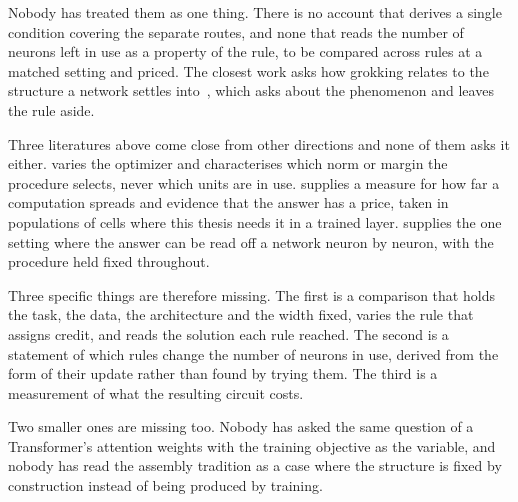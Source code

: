 Nobody has treated them as one thing. There is no account that derives a
single condition covering the separate routes, and none that reads the number
of neurons left in use as a property of the rule, to be compared across rules
at a matched setting and priced. The closest work asks how grokking relates to
the structure a network settles into~\cite{manningcoe_grokking_2025}, which
asks about the phenomenon and leaves the rule aside.

Three literatures above come close from other directions and none of them asks
it either.  varies the optimizer and characterises
which norm or margin the procedure selects, never which units are in use.
 supplies a measure for how far a computation spreads and
evidence that the answer has a price, taken in populations of cells where this
thesis needs it in a trained layer.  supplies the one setting where the
answer can be read off a network neuron by neuron, with the procedure held
fixed throughout.

Three specific things are therefore missing. The first is a comparison that
holds the task, the data, the architecture and the width fixed, varies the
rule that assigns credit, and reads the solution each rule reached. The second
is a statement of which rules change the number of neurons in use, derived
from the form of their update rather than found by trying them. The third is a
measurement of what the resulting circuit costs.

Two smaller ones are missing too. Nobody has asked the same question of a
Transformer's attention weights with the training objective as the variable,
and nobody has read the assembly tradition as a case where the structure is
fixed by construction instead of being produced by training.
